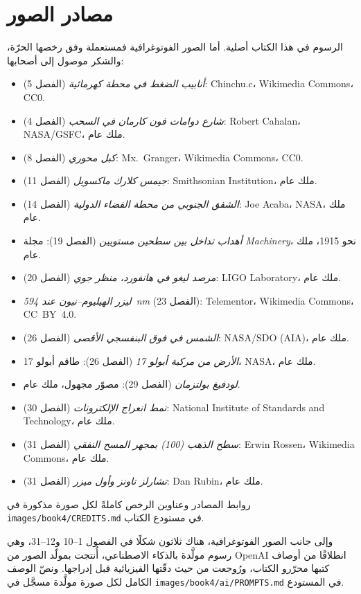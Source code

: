 \chapter*{مصادر الصور}

الرسوم في هذا الكتاب أصلية. أما الصور الفوتوغرافية فمستعملة وفق
رخصها الحرّة، والشكر موصول إلى أصحابها:

\begin{itemize}
  \item \emph{أنابيب الضغط في محطة كهرمائية} (الفصل 5): Chinchu.c،
        Wikimedia Commons، CC0.
  \item \emph{شارع دوامات فون كارمان في السحب} (الفصل 4): Robert
        Cahalan، NASA/GSFC، ملك عام.
  \item \emph{كبل محوري} (الفصل 8): Mx.~Granger، Wikimedia
        Commons، CC0.
  \item \emph{جيمس كلارك ماكسويل} (الفصل 11): Smithsonian
        Institution، ملك عام.
  \item \emph{الشفق الجنوبي من محطة الفضاء الدولية} (الفصل 14):
        Joe Acaba، NASA، ملك عام.
  \item \emph{أهداب تداخل بين سطحين مستويين} (الفصل 19): مجلة
        \emph{Machinery}، نحو 1915، ملك عام.
  \item \emph{مرصد ليغو في هانفورد، منظر جوي} (الفصل 20): LIGO
        Laboratory، ملك عام.
  \item \emph{ليزر الهيليوم--نيون عند 594~nm} (الفصل 23):
        Telementor، Wikimedia Commons، CC~BY~4.0.
  \item \emph{الشمس في فوق البنفسجي الأقصى} (الفصل 26): NASA/SDO
        (AIA)، ملك عام.
  \item \emph{الأرض من مركبة أبولو 17} (الفصل 26): طاقم أبولو 17،
        NASA، ملك عام.
  \item \emph{لودفيغ بولتزمان} (الفصل 29): مصوّر مجهول، ملك عام.
  \item \emph{نمط انعراج الإلكترونات} (الفصل 30): National Institute
        of Standards and Technology، ملك عام.
  \item \emph{سطح الذهب (100) بمجهر المسح النفقي} (الفصل 31): Erwin
        Rossen، Wikimedia Commons، ملك عام.
  \item \emph{تشارلز تاونز وأول ميزر} (الفصل 31): Dan Rubin، ملك
        عام.
\end{itemize}

روابط المصادر وعناوين الرخص كاملةً لكل صورة مذكورة
في \texttt{images/book4/CREDITS.md} في مستودع الكتاب.

\bigskip
وإلى جانب الصور الفوتوغرافية، هناك ثلاثون شكلًا في الفصول 1--10
و12--31، وهي رسوم مولَّدة بالذكاء الاصطناعي، أُنتجت بمولّد الصور من
OpenAI انطلاقًا من أوصاف كتبها محرّرو الكتاب، ورُوجعت من حيث دقّتها
الفيزيائية قبل إدراجها. ونصّ الوصف الكامل لكل صورة مولَّدة مسجَّل في
\texttt{images/book4/ai/PROMPTS.md} في المستودع.
\clearpage
